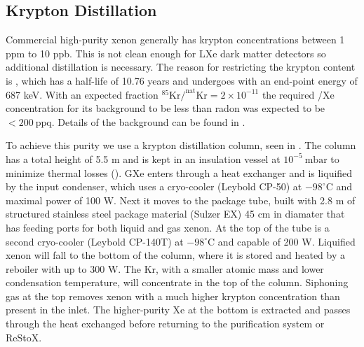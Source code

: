 \subsection{Krypton Distillation}
\label{subsec:xenon1t_kr_dist}
Commercial high-purity xenon generally has krypton concentrations between 1 ppm to 10 ppb.  This is not clean enough for LXe dark matter
detectors so additional distillation is necessary.  The reason for restricting the
krypton content is , which has a half-life of 10.76 years and undergoes \betadecay with an end-point energy of 687 keV.  With
an expected fraction $\mathrm{^{85}Kr / ^{nat}Kr = 2 \times 10^{-11}}$ the required /Xe concentration for its background to be
less than radon was expected to be $< 200\ \mathrm{ppq}$.  Details of the  background can be found in
.

To achieve this purity we use a krypton distillation column, seen in .  The column has a total
height of 5.5 m and is kept in an insulation vessel at $10^{-5}\ \mathrm{mbar}$ to minimize thermal losses ().  GXe
enters through a heat exchanger and is
liquified by the input condenser, which uses a cryo-cooler (Leybold CP-50) at $-98^{\circ}\mathrm{C}$ and maximal power
of 100 W.  Next it moves to the package tube, built with 2.8 m of structured stainless steel package material (Sulzer EX) 45 cm in
diamater that has feeding ports for both liquid and gas xenon.  At the top of the tube is a second cryo-cooler (Leybold CP-140T)
at $-98^{\circ}\mathrm{C}$ and capable of 200 W.  Liquified xenon will fall to the bottom of the column, where it is stored and heated by
a reboiler with up to 300 W.  The Kr, with a smaller atomic mass and lower condensation temperature, will concentrate in the top of the
column.  Siphoning gas at the top removes xenon with a much higher krypton concentration than
present in the inlet.  The higher-purity Xe at the bottom is extracted and passes through the heat exchanged before returning to the
purification system or ReStoX.

